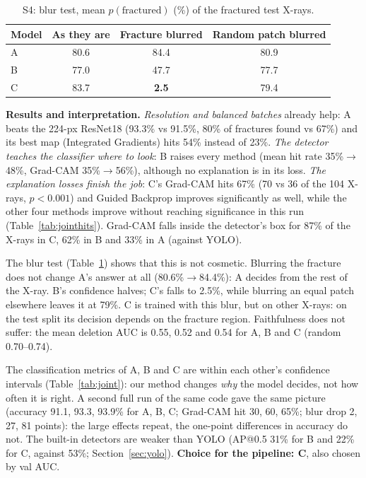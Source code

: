 \documentclass[conference]{IEEEtran}
\begin{document}
\begin{table}[t]
\centering
\caption{S4: blur test, mean $p(\text{fractured})$ (\%) of the fractured test X-rays.}
\label{tab:erase}
\renewcommand{\arraystretch}{1.1}
\begin{tabular}{lccc}
\toprule
Model & As they are & Fracture blurred & Random patch blurred \\
\midrule
A & 80.6 & 84.4 & 80.9 \\
B & 77.0 & 47.7 & 77.7 \\
C & 83.7 & \textbf{2.5} & 79.4 \\
\bottomrule
\end{tabular}
\end{table}

\textbf{Results and interpretation.} \emph{Resolution and balanced batches} already help: A beats the 224-px ResNet18
(93.3\% vs 91.5\%, 80\% of fractures found vs 67\%) and its best map (Integrated Gradients) hits 54\% instead of 23\%.
\emph{The detector teaches the classifier where to look}: B raises every method (mean hit rate 35\%$\to$48\%, Grad-CAM
35\%$\to$56\%), although no explanation is in its loss. \emph{The explanation losses finish the job}: C's Grad-CAM hits
67\% (70 vs 36 of the 104 X-rays, $p<0.001$) and Guided Backprop improves significantly as well, while the other four
methods improve without reaching significance in this run (Table~\ref{tab:jointhits}). Grad-CAM falls inside the
detector's box for 87\% of the X-rays in C, 62\% in B and 33\% in A (against YOLO).

The blur test (Table~\ref{tab:erase}) shows that this is not cosmetic. Blurring the fracture does not change A's answer
at all (80.6\%$\to$84.4\%): A decides from the rest of the X-ray. B's confidence halves; C's falls to 2.5\%, while
blurring an equal patch elsewhere leaves it at 79\%. C is trained with this blur, but on other X-rays: on the test
split its decision depends on the fracture region. Faithfulness does not suffer: the mean deletion AUC is 0.55, 0.52
and 0.54 for A, B and C (random 0.70--0.74).

The classification metrics of A, B and C are within each other's confidence intervals (Table~\ref{tab:joint}): our
method changes \emph{why} the model decides, not how often it is right. A second full run of the same code gave the same
picture (accuracy 91.1, 93.3, 93.9\% for A, B, C; Grad-CAM hit 30, 60, 65\%; blur drop 2, 27, 81 points): the large
effects repeat, the one-point differences in accuracy do not. The built-in detectors are weaker than YOLO (AP@0.5 31\%
for B and 22\% for C, against 53\%; Section~\ref{sec:yolo}). \textbf{Choice for the pipeline: C}, also chosen by val AUC.
\end{document}
